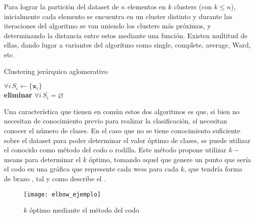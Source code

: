 				Para lograr la partición del dataset de $n$ elementos en $k$ clusters (con $k \leq n$), inicialmente cada elemento se encuentra en un cluster distinto y durante las iteraciones del algoritmo se van uniendo los clusters más próximos, y determinando la distancia entre estos mediante una función. Existen multitud de ellas, dando lugar a variantes del algoritmo como single, complete, average, Ward, etc. \cite{ahc_variantes}\\
				
				\begin{algorithm}
					\DontPrintSemicolon
					
					\caption{Clustering jerárquico aglomerativo}
					\label{algo:ahc}
					
					$\forall i \, S_i \gets \{\textbf{x}_i\}$\\
					\textbf{eliminar} $\forall i \, S_i = \varnothing$
				\end{algorithm}
				
				Una característica que tienen en común estos dos algoritmos es que, si bien no necesitan de conocimiento previo para realizar la clasificación, sí necesitan conocer el número de clases. En el caso que no se tiene conocimiento suficiente sobre el dataset para poder determinar el valor óptimo de clases, se puede utilizar el conocido como método del codo o rodilla. Este método propone utilizar $k-$means para determinar el $k$ óptimo, tomando aquel que genere un punto que sería el codo en una gráfica que represente cada \gls{wcss} para cada $k$, que tendría forma de brazo \cite{elbow}, tal y como describe el . \\
				
				\begin{figure}[!h]
					\centering
					\texttt{[image: elbow\_ejemplo]}
					\caption{$k$ óptimo mediante el método del codo}
					\label{fig:ejemplo_codo}
				\end{figure}
				
